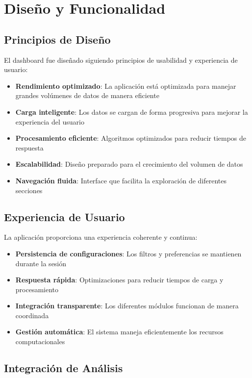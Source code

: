 \documentclass[12pt,a4paper,twoside,openany]{book}
\begin{document}
\section{Diseño y Funcionalidad}

\subsection{Principios de Diseño}

El dashboard fue diseñado siguiendo principios de usabilidad y experiencia de usuario:

\begin{itemize}
    \item \textbf{Rendimiento optimizado}: La aplicación está optimizada para manejar grandes volúmenes de datos de manera eficiente
    \item \textbf{Carga inteligente}: Los datos se cargan de forma progresiva para mejorar la experiencia del usuario
    \item \textbf{Procesamiento eficiente}: Algoritmos optimizados para reducir tiempos de respuesta
    \item \textbf{Escalabilidad}: Diseño preparado para el crecimiento del volumen de datos
    \item \textbf{Navegación fluida}: Interface que facilita la exploración de diferentes secciones
\end{itemize}

\subsection{Experiencia de Usuario}

La aplicación proporciona una experiencia coherente y continua:

\begin{itemize}
    \item \textbf{Persistencia de configuraciones}: Los filtros y preferencias se mantienen durante la sesión
    \item \textbf{Respuesta rápida}: Optimizaciones para reducir tiempos de carga y procesamiento
    \item \textbf{Integración transparente}: Los diferentes módulos funcionan de manera coordinada
    \item \textbf{Gestión automática}: El sistema maneja eficientemente los recursos computacionales
\end{itemize}

\subsection{Integración de Análisis}
\end{document}

